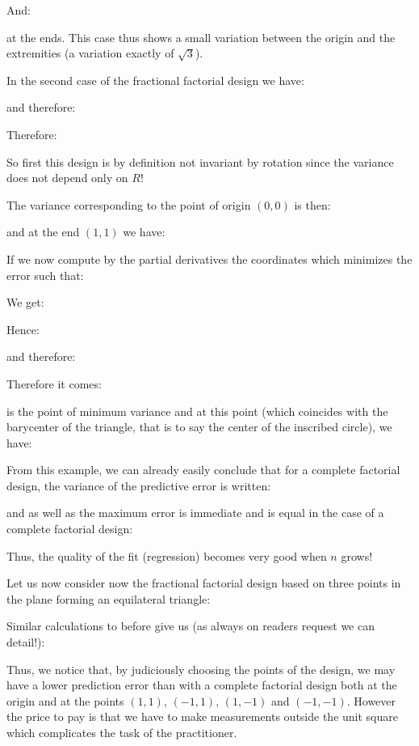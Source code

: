 	And:
	
 	at the ends. This case thus shows a small variation between the origin and the extremities (a variation exactly of $\sqrt{3}$).

	In the second case of the fractional factorial design we have:
	
	and therefore:
	
	Therefore:
	
	So first this design is by definition not invariant by rotation since the variance does not depend only on $R$!

	The variance corresponding to the point of origin $(0,0)$ is then:
	
 	and at the end $(1,1)$ we have:
	
 	If we now compute by the partial derivatives the coordinates which minimizes the error such that:
	
 	We get:
	
 	Hence:
	
	and therefore:
	
	Therefore it comes:
	
	is the point of minimum variance and at this point (which coincides with the barycenter of the triangle, that is to say the center of the inscribed circle), we have:
	
 	From this example, we can already easily conclude that for a complete factorial design, the variance of the predictive error is written:
	
 	and as well as the maximum error is immediate and is equal in the case of a complete factorial design:
	
 	Thus, the quality of the fit (regression) becomes very good when $n$ grows!

	Let us now consider now the fractional factorial design based on three points in the plane forming an equilateral triangle:
	
	Similar calculations to before give us (as always on readers request we can detail!):
	
	Thus, we notice that, by judiciously choosing the points of the design, we may have a lower prediction error than with a complete factorial design both at the origin and at the points $(1, 1)$, $(-1,1)$, $(1, -1)$ and $(-1, -1)$. However the price to pay is that we have to make measurements outside the unit square which complicates the task of the practitioner.
	
	
	
